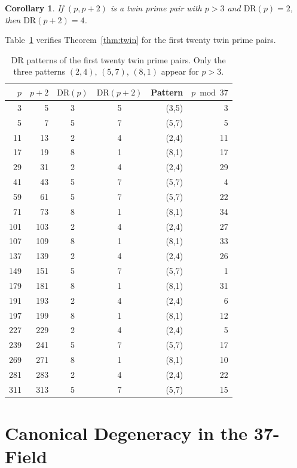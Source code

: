 \documentclass[12pt]{article}
\newtheorem{corollary}[theorem]{Corollary}
\begin{document}
\begin{corollary}
\label{cor:twin_dr2}
If $(p,p+2)$ is a twin prime pair with $p > 3$ and $\mathrm{DR}(p)=2$, then
$\mathrm{DR}(p+2)=4$.
\end{corollary}

Table~\ref{tab:twin} verifies Theorem~\ref{thm:twin} for the first twenty
twin prime pairs.

\begin{table}[h]
\centering
\begin{tabular}{rrccrr}
\toprule
$p$ & $p+2$ & $\mathrm{DR}(p)$ & $\mathrm{DR}(p+2)$ & Pattern & $p\bmod 37$ \\
\midrule
3   & 5   & 3 & 5 & (3,5) & 3 \\
5   & 7   & 5 & 7 & (5,7) & 5 \\
11  & 13  & 2 & 4 & (2,4) & 11 \\
17  & 19  & 8 & 1 & (8,1) & 17 \\
29  & 31  & 2 & 4 & (2,4) & 29 \\
41  & 43  & 5 & 7 & (5,7) & 4 \\
59  & 61  & 5 & 7 & (5,7) & 22 \\
71  & 73  & 8 & 1 & (8,1) & 34 \\
101 & 103 & 2 & 4 & (2,4) & 27 \\
107 & 109 & 8 & 1 & (8,1) & 33 \\
137 & 139 & 2 & 4 & (2,4) & 26 \\
149 & 151 & 5 & 7 & (5,7) & 1 \\
179 & 181 & 8 & 1 & (8,1) & 31 \\
191 & 193 & 2 & 4 & (2,4) & 6 \\
197 & 199 & 8 & 1 & (8,1) & 12 \\
227 & 229 & 2 & 4 & (2,4) & 5 \\
239 & 241 & 5 & 7 & (5,7) & 17 \\
269 & 271 & 8 & 1 & (8,1) & 10 \\
281 & 283 & 2 & 4 & (2,4) & 22 \\
311 & 313 & 5 & 7 & (5,7) & 15 \\
\bottomrule
\end{tabular}
\caption{DR patterns of the first twenty twin prime pairs.
Only the three patterns $(2,4)$, $(5,7)$, $(8,1)$ appear for $p>3$.}
\label{tab:twin}
\end{table}

\section{Canonical Degeneracy in the 37-Field}
\label{sec:37field}
\end{document}
